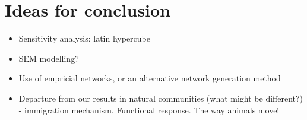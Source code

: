 

\section{Ideas for conclusion}
\label{sec:conc_ideas}

\begin{itemize}
	\item Sensitivity analysis: latin hypercube
	\item SEM modelling?
	\item Use of empricial networks, or an alternative network generation method
	
	\item Departure from our results in natural communities (what might be different?) - immigration mechanism. Functional response. The way animals move!
\end{itemize}

